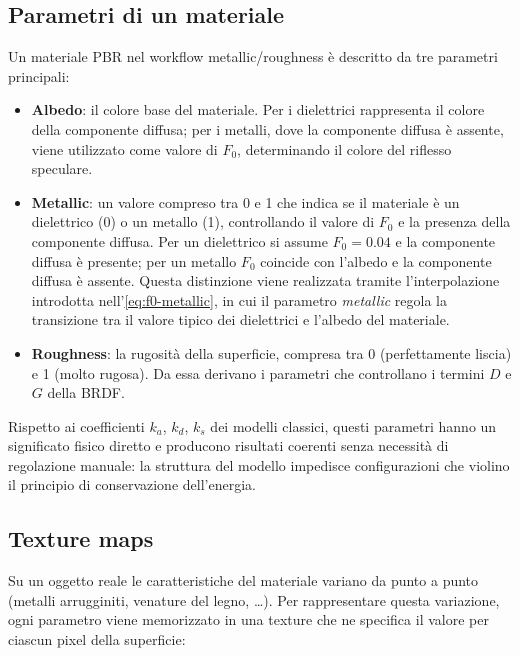 \documentclass[12pt,a4paper,twoside]{book}
\begin{document}
\subsection{Parametri di un materiale}
\label{subsec:parametri-materiale}
Un materiale PBR nel workflow metallic/roughness è descritto da tre parametri principali:
\begin{itemize}
    \item \textbf{Albedo}: il colore base del materiale. Per i dielettrici rappresenta il colore della componente diffusa; per i metalli, dove la componente diffusa è assente, viene utilizzato come valore di $F_0$, determinando il colore del riflesso speculare.
    \item \textbf{Metallic}: un valore compreso tra 0 e 1 che indica se il materiale è un dielettrico (0) o un metallo (1), controllando il valore di $F_0$ e la presenza della componente diffusa. Per un dielettrico si assume $F_0 = 0.04$ e la componente diffusa è presente; per un metallo $F_0$ coincide con l'albedo e la componente diffusa è assente. Questa distinzione viene realizzata tramite l'interpolazione introdotta nell'\cref{eq:f0-metallic}, in cui il parametro \textit{metallic} regola la transizione tra il valore tipico dei dielettrici e l'albedo del materiale.
    \item \textbf{Roughness}: la rugosità della superficie, compresa tra 0 (perfettamente liscia) e 1 (molto rugosa). Da essa derivano i parametri che controllano i termini $D$ e $G$ della BRDF.
\end{itemize}
Rispetto ai coefficienti $k_a$, $k_d$, $k_s$ dei modelli classici, questi parametri hanno un significato fisico diretto e producono risultati coerenti senza necessità di regolazione manuale: la struttura del modello impedisce configurazioni che violino il principio di conservazione dell'energia.

\subsection{Texture maps}
\label{subsec:texture-maps}

Su un oggetto reale le caratteristiche del materiale variano da punto a punto (metalli arrugginiti, venature del legno, \dots). Per rappresentare questa variazione, ogni parametro viene memorizzato in una texture che ne specifica il valore per ciascun pixel della superficie:
\end{document}

